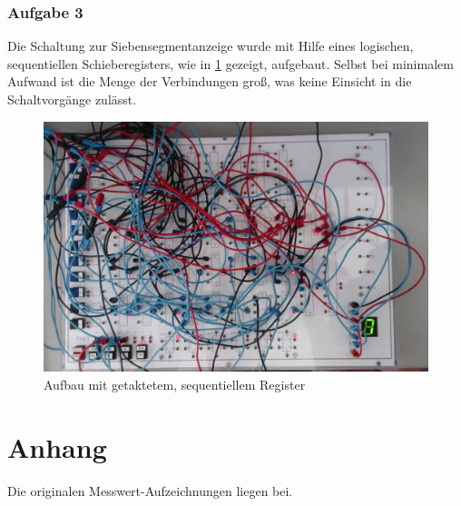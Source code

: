 \documentclass[numbers=noenddot,12pt,a4paper]{scrartcl}
\begin{document}
\subsubsection{Aufgabe 3}
Die Schaltung zur Siebensegmentanzeige wurde mit Hilfe eines logischen, sequentiellen Schieberegisters, wie in \ref{img:anzeigefarbe} gezeigt, aufgebaut. Selbst bei minimalem Aufwand ist die Menge der Verbindungen groß, was keine Einsicht in die Schaltvorgänge zulässt.
\begin{figure}[H]
\centering
\includegraphics[width=\textwidth]{anzeigefarb.png}
\caption{Aufbau mit getaktetem, sequentiellem Register} \label{img:anzeigefarbe}
\end{figure}
\section{Anhang}
Die originalen Messwert-Aufzeichnungen liegen bei.
\end{document}
